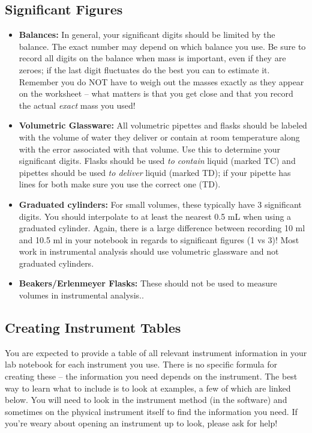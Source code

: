 \documentclass[]{tufte-book}
\providecommand{\tightlist}{%
  \setlength{\itemsep}{0pt}\setlength{\parskip}{0pt}}
\begin{document}
\hypertarget{significant-figures}{%
\subsection*{Significant Figures}\label{significant-figures}}

\begin{itemize}
\tightlist
\item
  \textbf{Balances:} In general, your significant digits should be limited by the balance. The exact number may depend on which balance you use. Be sure to record all digits on the balance when mass is important, even if they are zeroes; if the last digit fluctuates do the best you can to estimate it. Remember you do NOT have to weigh out the masses exactly as they appear on the worksheet -- what matters is that you get close and that you record the actual \emph{exact} mass you used!
\item
  \textbf{Volumetric Glassware:} All volumetric pipettes and flasks should be labeled with the volume of water they deliver or contain at room temperature along with the error associated with that volume. Use this to determine your significant digits. Flasks should be used \emph{to contain} liquid (marked TC) and pipettes should be used \emph{to deliver} liquid (marked TD); if your pipette has lines for both make sure you use the correct one (TD).
\item
  \textbf{Graduated cylinders:} For small volumes, these typically have 3 significant digits. You should interpolate to at least the nearest 0.5 mL when using a graduated cylinder. Again, there is a large difference between recording 10 ml and 10.5 ml in your notebook in regards to significant figures (1 vs 3)! Most work in instrumental analysis should use volumetric glassware and not graduated cylinders.
\item
  \textbf{Beakers/Erlenmeyer Flasks:} These should not be used to measure volumes in instrumental analysis..
\end{itemize}

\hypertarget{creating-instrument-tables}{%
\subsection*{Creating Instrument Tables}\label{creating-instrument-tables}}

You are expected to provide a table of all relevant instrument information in your lab notebook for each instrument you use. There is no specific formula for creating these -- the information you need depends on the instrument. The best way to learn what to include is to look at examples, a few of which are linked below. You will need to look in the instrument method (in the software) and sometimes on the physical instrument itself to find the information you need. If you're weary about opening an instrument up to look, please ask for help!
\end{document}
